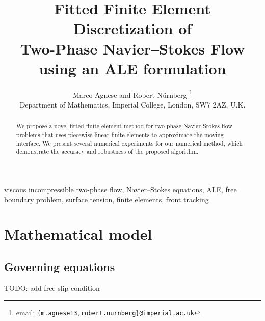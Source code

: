 \documentclass[a4paper,12pt,onecolumn]{article}
\title{Fitted Finite Element Discretization of \\ Two-Phase Navier--Stokes
Flow using an ALE formulation}
\author{Marco Agnese and Robert N\"urnberg%
\thanks{email: \texttt{\{m.agnese13,robert.nurnberg\}@imperial.ac.uk}}\\
\small
Department of Mathematics, Imperial College, London, SW7 2AZ, U.K.}
\date{}
\newenvironment{keywords}{{\upshape\bfseries Key words. }\ignorespaces}{}
\begin{document}
\captionsetup[subfigure]{labelformat=empty} %

\maketitle

\begin{abstract}
We propose a novel fitted finite element method for two-phase Navier-Stokes
flow problems that uses piecewise linear finite elements to approximate the
moving interface. We present several numerical experiments for our numerical
method, which demonstrate the accuracy and robustness of the proposed algorithm.
\end{abstract}

\begin{keywords}
viscous incompressible two-phase flow, Navier--Stokes equations, ALE,
free boundary problem, surface tension, finite elements, front tracking
\end{keywords}

\section{Mathematical model} \label{sec:model}

\subsection{Governing equations}\label{sec:equations}
TODO: add free slip condition
\end{document}
